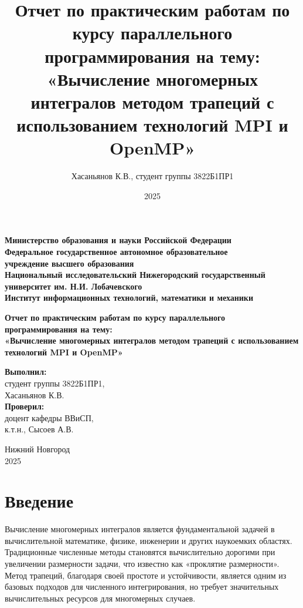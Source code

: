 \documentclass[a4paper,12pt]{article}
\title{Отчет по практическим работам по курсу параллельного программирования на тему:\\[20pt]
«Вычисление многомерных интегралов методом трапеций с использованием технологий MPI и OpenMP»}
\author{Хасаньянов К.В., студент группы 3822Б1ПР1}
\date{2025}
\begin{document}
\sloppy

\begin{titlepage}
    \centering
    \textbf{Министерство образования и науки Российской Федерации\\[5pt]
    Федеральное государственное автономное образовательное\\
    учреждение высшего образования\\
    Национальный исследовательский Нижегородский государственный университет им. Н.И. Лобачевского\\[10pt]
    Институт информационных технологий, математики и механики}\\[30pt]
    
    \vfill
    
    \textbf{\Large Отчет по практическим работам по курсу параллельного программирования на тему:\\[20pt]
    «Вычисление многомерных интегралов методом трапеций с использованием технологий MPI и OpenMP»}\\[70pt]
    
    \hfill\parbox{0.35\textwidth}{
        \textbf{Выполнил:}\\
        студент группы 3822Б1ПР1,\\
        Хасаньянов К.В.\\[10pt]
        \textbf{Проверил:}\\
        доцент кафедры ВВиСП,\\
        к.т.н., Сысоев А.В.\\
    }
    
    \vfill
    
    Нижний Новгород\\
    2025
\end{titlepage}

\clearpage
\tableofcontents
\clearpage

\section*{Введение}
Вычисление многомерных интегралов является фундаментальной задачей в вычислительной математике, физике, инженерии и других наукоемких областях. 
Традиционные численные методы становятся вычислительно дорогими при увеличении размерности задачи, что известно как «проклятие размерности». 
Метод трапеций, благодаря своей простоте и устойчивости, является одним из базовых подходов для численного интегрирования, но требует значительных вычислительных ресурсов для многомерных случаев.
\end{document}
